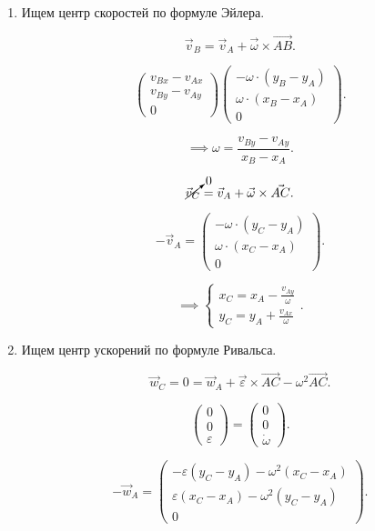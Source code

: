 \documentclass[a4paper,12pt]{report}
\begin{document}
\begin{enumerate}
  \item Ищем центр скоростей по формуле Эйлера.

\[
\vec{v}_B = \vec{v}_A + \vec{\omega} \times \vec{AB}
.\] 

\[
  \begin{pmatrix} 
    v_{Bx} - v_{Ax} \\
    v_{By} - v_{Ay} \\
    0
  \end{pmatrix} 
  \begin{pmatrix}
    -\omega \cdot \left( y_B - y_A \right) \\
    \omega \cdot ( x_B - x_A) \\
    0
  \end{pmatrix} 
.\] 

\[
  \implies \omega = \frac{v_{By} - v_{Ay}}{x_B - x_A}
.\] 

\[
  \cancelto{0}{\vec{v}_C} = \vec{v}_A + \vec{\omega} \times \vec{AC}
.\] 

\[
-\vec{v}_A = \begin{pmatrix} 
  -\omega \cdot (y_C - y_A) \\
  \omega \cdot (x_C - x_A) \\
  0
\end{pmatrix} 
.\] 

\[
\implies
\begin{cases}
  x_C = x_A - \frac{v_{Ay}}{\omega} \\
  y_C = y_A + \frac{v_{Ax}}{\omega}
\end{cases}
.\] 

  \item Ищем центр ускорений по формуле Ривальса.

\[
  \vec{w}_C = 0 = \vec{w}_A + \vec{\varepsilon} \times \vec{AC} - \omega^2 \vec{AC}
.\] 

\[
\begin{pmatrix} 0 \\ 0 \\ \varepsilon \end{pmatrix} =
\begin{pmatrix} 0 \\ 0 \\ \dot \omega \end{pmatrix} 
.\] 

\[
-\vec{w}_A = \begin{pmatrix} 
  -\varepsilon(y_C - y_A) - \omega^2 (x_C - x_A) \\
  \varepsilon (x_C - x_A) - \omega^2 (y_C - y_A) \\
  0
\end{pmatrix} 
.\] 


\end{enumerate}
\end{document}
